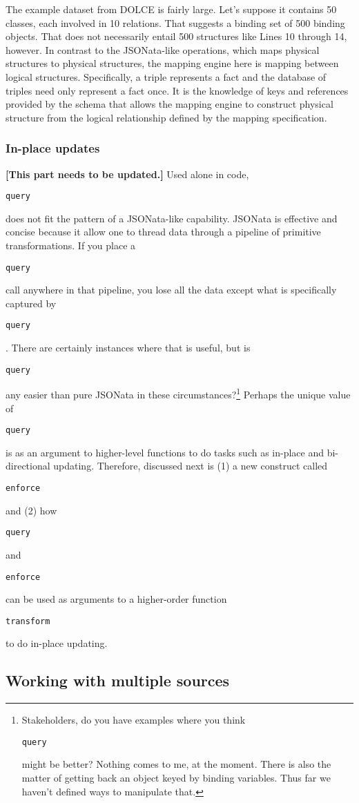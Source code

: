\documentclass[9pt,letterpaper]{article}
\newcommand{\stt}[1]{\begin{footnotesize}\texttt{#1}\end{footnotesize}}
\begin{document}
The example dataset from DOLCE is fairly large.
Let's suppose it contains 50 classes, each involved in 10 relations.
That suggests a binding set of 500 binding objects.
That does not necessarily entail 500 structures like Lines 10 through 14, however.
In contrast to the JSONata-like operations, which maps physical structures to physical structures,
the mapping engine here is mapping between logical structures.
Specifically, a triple represents a fact and the database of triples need only represent a fact once.
It is the knowledge of keys and references provided by the schema that allows the mapping engine to construct physical structure
from the logical relationship defined by the mapping specification.



\subsubsection{In-place updates}

\textbf{[This part needs to be updated.]} Used alone in code, \stt{query} does not fit the pattern of a JSONata-like capability.
JSONata is effective and concise because it allow one to thread data through a pipeline of primitive transformations.
If you place a \stt{query} call anywhere in that pipeline, you lose all the data except what is specifically captured by \stt{query}.
There are certainly instances where that is useful, but is \stt{query} any easier than pure JSONata in these circumstances?\footnote{Stakeholders, do you have
  examples where you think \stt{query} might be better?
  Nothing comes to me, at the moment.
  There is also the matter of getting back an object keyed by binding variables.
  Thus far we haven't defined ways to manipulate that.}
Perhaps the unique value of \stt{query} is as an argument to higher-level functions to do tasks such as in-place and bi-directional updating.
Therefore, discussed next is (1) a new construct called \stt{enforce} and (2) how \stt{query} and \stt{enforce} can be used as arguments to a higher-order function \stt{transform} to do in-place updating.

\subsection{Working with multiple sources}
\end{document}
